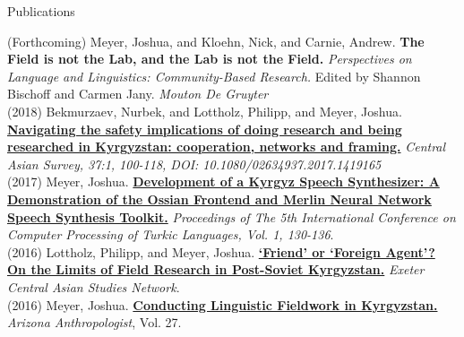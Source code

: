 \documentclass{resume} %
\begin{document}
\begin{minipage}{\textwidth}

  \begin{rSection}{Publications}
    \vspace{.25cm}

        {(Forthcoming)} {Meyer, Joshua, and Kloehn, Nick, and Carnie, Andrew.} {{\bf The Field is not the Lab, and the Lab is not the Field.}} {{\it Perspectives on Language and Linguistics: Community-Based Research.} Edited by Shannon Bischoff and Carmen Jany. \textit{Mouton De Gruyter}} \\

        {(2018)} {Bekmurzaev, Nurbek, and Lottholz, Philipp, and Meyer, Joshua.} {\href{https://www.tandfonline.com/doi/abs/10.1080/02634937.2017.1419165}{\textbf{Navigating the safety implications of doing research and being researched in Kyrgyzstan: cooperation, networks and framing.}}} {\textit{Central Asian Survey, 37:1, 100-118, DOI: 10.1080/02634937.2017.1419165}} \\
        
        {(2017)} {Meyer, Joshua.} {\href{http://www.turklang.tatar/wp-content/uploads/2017/05/TurkLang-2017.-Tom1.pdf}{{\bf Development of a Kyrgyz Speech Synthesizer: A Demonstration of the Ossian Frontend and Merlin Neural Network Speech Synthesis Toolkit.}}} {\textit{Proceedings of The 5th International Conference on Computer Processing of Turkic Languages, Vol. 1, 130-136}.} \\ 

        {(2016)} {Lottholz, Philipp, and Meyer, Joshua.} { \href{https://blogs.exeter.ac.uk/excas/2016/04/14/friend-or-foreign-agent-on-the-limits-of-field-research-in-post-soviet-kyrgyzstan/}{\bf ‘Friend’ or ‘Foreign Agent’? On the Limits of Field Research in Post-Soviet Kyrgyzstan.}} {\textit{Exeter Central Asian Studies Network}.}\\
 
        {(2016)} {Meyer, Joshua.} { \href{https://journals.uair.arizona.edu/index.php/arizanthro/article/viewFile/21375/20949}{\bf Conducting Linguistic Fieldwork in Kyrgyzstan.}} {\textit{Arizona Anthropologist}, Vol. 27.} \\

    

\end{rSection}

\end{minipage}
\end{document}
